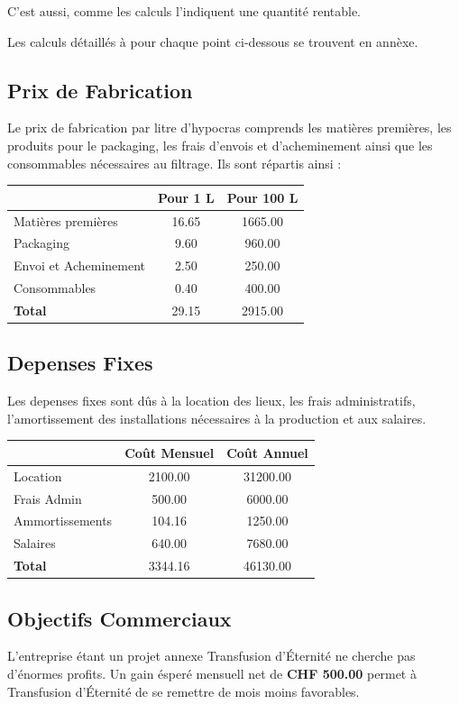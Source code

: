 \documentclass[10pt,a4paper]{article}
\newcommand{\tde}{Transfusion d'Éternité}
\begin{document}
C'est aussi, comme les calculs l'indiquent une quantité rentable.

Les calculs détaillés à pour chaque point ci-dessous se trouvent en annèxe.

\subsection{Prix de Fabrication}
Le prix de fabrication par litre d'hypocras comprends les matières premières, les produits pour le packaging, les frais d'envois et d'acheminement ainsi que les consommables nécessaires au filtrage.
Ils sont répartis ainsi :

\vspace{0.5cm}
\begin{tabular}{|l|S[table-format=4.2]|S[table-format=4.2]|}
\hline
& \textbf{Pour 1 L} & \textbf{Pour 100 L} \\\hline
Matières premières & 16.65 & 1665.00\\ 
Packaging & 9.60 & 960.00\\ 
Envoi et Acheminement & 2.50 & 250.00 \\
Consommables & 0.40 & 400.00\\\hline
\textbf{Total} & 29.15 & 2915.00\\\hline
\end{tabular}


\subsection{Depenses Fixes}
Les depenses fixes sont dûs à la location des lieux, les frais administratifs, l'amortissement des installations nécessaires à la production et aux salaires.

\vspace{0.5cm}
\begin{tabular}{|l|S[table-format=3.2]|S[table-format=3.2]|}
\hline
& \textbf{Coût Mensuel} & \textbf{Coût Annuel} \\\hline
Location & 2100.00 & 31200.00\\
Frais Admin & 500.00 & 6000.00 \\
Ammortissements & 104.16 & 1250.00\\
Salaires & 640.00 & 7680.00 \\\hline
\textbf{Total} & 3344.16 & 46130.00 \\\hline
\end{tabular}

\subsection{Objectifs Commerciaux}
L'entreprise étant un projet annexe \tde{} ne cherche pas d'énormes profits.
Un gain ésperé mensuell net de \textbf{CHF 500.00} permet à \tde{} de se remettre de mois moins favorables.
\end{document}

